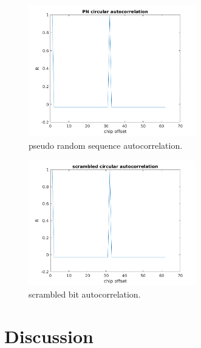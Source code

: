\documentclass{article}
\begin{document}
\begin{figure}[h]
  \begin{center}
    \includegraphics[width=0.65\textwidth]{img/pn_corr.png}
    \caption{pseudo random sequence autocorrelation.}
  \end{center}
\end{figure}

\begin{figure}[h]
  \begin{center}
    \includegraphics[width=0.65\textwidth]{img/sc_corr.png}
    \caption{scrambled bit autocorrelation.}
  \end{center}
\end{figure}



\section{Discussion}






\end{document}
